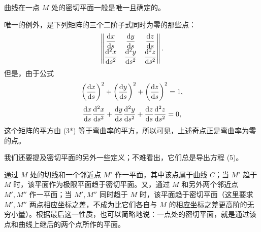曲线在一点 \(M\) 处的密切平面一般是唯一且确定的。

唯一的例外，是下列矩阵的三个二阶子式同时为零的那些点：
\[
\left\|\begin{matrix}
\dfrac{\mathrm{d} x}{\mathrm{d} s} & \dfrac{\mathrm{d} y}{\mathrm{d} s} & \dfrac{\mathrm{d} z}{\mathrm{d} s}\\
\dfrac{\mathrm{d}^2x}{\mathrm{d} s^2} & \dfrac{\mathrm{d}^2y}{\mathrm{d} s^2} & \dfrac{\mathrm{d}^2z}{\mathrm{d} s^2}
\end{matrix}\right\|.
\]
但是，由于公式
\[
\left(\frac{\mathrm{d} x}{\mathrm{d} s}\right)^2+\left(\frac{\mathrm{d} y}{\mathrm{d} s}\right)^2+\left(\frac{\mathrm{d} z}{\mathrm{d} s}\right)^2=1,
\]
\[
\frac{\mathrm{d} x}{\mathrm{d} s}\frac{\mathrm{d}^2x}{\mathrm{d} s^2}+\frac{\mathrm{d} y}{\mathrm{d} s}\frac{\mathrm{d}^2y}{\mathrm{d} s^2}+\frac{\mathrm{d} z}{\mathrm{d} s}\frac{\mathrm{d}^2z}{\mathrm{d} s^2}=0,
\]
这个矩阵的平方由 (3*) 等于弯曲率的平方，所以可见，上述奇点正是弯曲率为零的点。

我们还要提及密切平面的另外一些定义；不难看出，它们总是导出方程 (5)。

通过 \(M\) 处的切线和一个邻近点 \(M'\) 作一平面，其中该点属于曲线 \(C\)；当 \(M'\) 趋于 \(M\) 时，该平面作为极限平面趋于密切平面。又，通过 \(M\) 和另外两个邻近点 \(M',M''\) 作一平面；当 \(M',M''\) 同时趋于 \(M\) 时，该平面趋于密切平面（这里要求 \(M',M''\) 两点相应坐标之差，不成为比它们各自与 \(M\) 的相应坐标之差更高阶的无穷小量）。根据最后这一性质，也可以简略地说：一点处的密切平面，就是通过该点和曲线上继后的两个点所作的平面。
